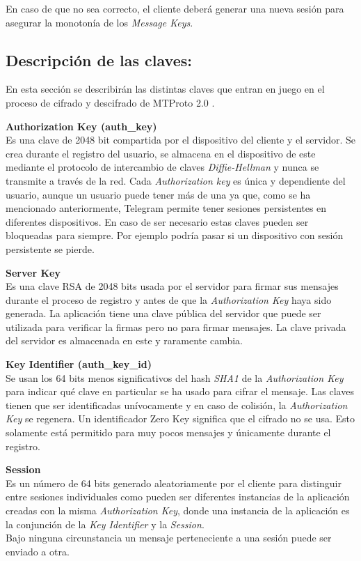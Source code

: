 En caso de que no sea correcto, el cliente deberá generar una nueva sesión para asegurar la monotonía de los \emph{Message Keys}.

\subsection{Descripción de las claves:}
En esta sección se describirán las distintas claves que entran en juego en el proceso de cifrado y descifrado de MTProto 2.0 \cite{telegram2}.

\begin{description}
	\item \textbf{Authorization Key (auth\_key)}\\
	Es una clave de 2048 bit compartida por el dispositivo del cliente y el servidor. Se crea durante el registro del usuario, se almacena en el dispositivo de este mediante el protocolo de intercambio de claves \emph{Diffie-Hellman} y nunca se transmite a través de la red. Cada \emph{Authorization key} es única y dependiente del usuario, aunque un usuario puede tener más de una ya que, como se ha mencionado anteriormente, Telegram permite tener sesiones persistentes en diferentes dispositivos. En caso de ser necesario estas claves pueden ser bloqueadas para siempre. Por ejemplo podría pasar si un dispositivo con sesión persistente se pierde.

	\item \textbf{Server Key}\\
	Es una clave RSA de 2048 bits usada por el servidor para firmar sus mensajes durante el proceso de registro y antes de que la \emph{Authorization Key} haya sido generada. La aplicación tiene una clave pública del servidor que puede ser utilizada para verificar la firmas pero no para firmar mensajes. La clave privada del servidor es almacenada en este y raramente cambia.

	\item \textbf{Key Identifier (auth\_key\_id)}\\
	Se usan los 64 bits menos significativos del hash \emph{SHA1} de la \emph{Authorization Key} para indicar qué clave en particular se ha usado para cifrar el mensaje. Las claves tienen que ser identificadas unívocamente y en caso de colisión, la \emph{Authorization Key} se regenera. Un identificador Zero Key significa que el cifrado no se usa. Esto solamente está permitido para muy pocos mensajes y únicamente durante el registro.
	
	\item \textbf{Session}\\
	Es un número de 64 bits generado aleatoriamente por el cliente para distinguir entre sesiones individuales como pueden ser diferentes instancias de la aplicación creadas con la misma \emph{Authorization Key}, donde una instancia de la aplicación es la conjunción de la \emph{Key Identifier} y la \emph{Session}.\\
	Bajo ninguna circunstancia un mensaje perteneciente a una sesión puede ser enviado a otra.


\end{description}
